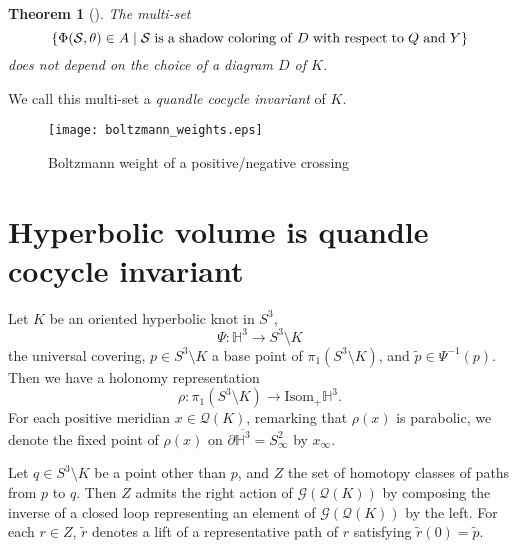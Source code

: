 \documentclass[12pt]{amsart}
\newtheorem{theorem}{Theorem}[section]
\theoremstyle{definition}
\begin{document}
\begin{theorem}[\cite{CJKLS1, FRS1, Kamada1}]
The multi-set
\[
 \{ \Phi(\mathcal{S}, \theta) \in A \mid \mathcal{S} \hskip 0.3em \mathrm{is \hskip 0.3em a \hskip 0.3em shadow \hskip 0.3em coloring \hskip 0.3em of} \hskip 0.3em D \hskip 0.3em \mathrm{with \hskip 0.3em respect \hskip 0.3em to} \hskip 0.3em Q \hskip 0.3em \mathrm{and} \hskip 0.3em Y \}
\]
does not depend on the choice of a diagram $D$ of $K$.
\end{theorem}

\noindent
We call this multi-set a {\it quandle cocycle invariant} of $K$.

\begin{figure}[htb]
\begin{center}
\texttt{[image: boltzmann\_weights.eps]}
\end{center}
\vspace{-10pt}
\caption{Boltzmann weight of a positive/negative crossing}
\label{fig:boltzmann_weight}
\end{figure}

\section{Hyperbolic volume is quandle cocycle invariant}\label{sec:hyperbolic_volume_is_quandle_cocycle_invariant}

Let $K$ be an oriented hyperbolic knot in $S^{3}$,
\[
 \Psi : \mathbb{H}^{3} \longrightarrow S^{3} \setminus K
\]
the universal covering, $p \in S^{3} \setminus K$ a base point of $\pi_{1}(S^{3} \setminus K)$, and $\widetilde{p} \in \Psi^{-1}(p)$.
Then we have a holonomy representation
\[
 \rho : \pi_{1}(S^{3} \setminus K) {\longrightarrow} \mathrm{Isom}_{+} \mathbb{H}^{3}.
\]
For each positive meridian $x \in \mathcal{Q}(K)$, remarking that $\rho(x)$ is parabolic, we denote the fixed point of $\rho(x)$ on $\partial \overline{\mathbb{H}^{3}} = S^{2}_{\infty}$ by $x_{\infty}$.

Let $q \in S^{3} \setminus K$ be a point other than $p$, and $Z$ the set of homotopy classes of paths from $p$ to $q$.
Then $Z$ admits the right action of $\mathcal{G}(\mathcal{Q}(K))$ by composing the inverse of a closed loop representing an element of $\mathcal{G}(\mathcal{Q}(K))$ by the left.
For each $r \in Z$, $\widetilde{r}$ denotes a lift of a representative path of $r$ satisfying $\widetilde{r}(0) = \widetilde{p}$.
\end{document}
